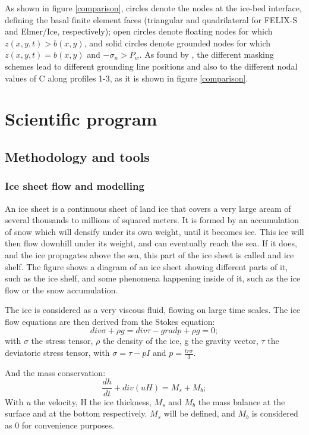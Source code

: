 \documentclass[a4paper,12pt]{article}
\begin{document}
As shown in figure \ref{comparison}, circles denote the nodes at the ice-bed interface, defining the basal finite element faces (triangular and quadrilateral for FELIX-S and Elmer/Ice, respectively); open circles denote floating nodes for which $z(x,y,t)>b(x,y)$, and solid circles denote grounded nodes for which $z(x,y,t)=b(x,y)$ and $-\sigma_n>P_w$. As found by \cite{zhang2017comparison}, the different masking schemes lead to different grounding line positions and also to the different nodal values of C along profiles 1-3, as it is shown in figure \ref{comparison}.


\section{Scientific program}
\subsection{Methodology and tools}
\subsubsection{Ice sheet flow and modelling}
An ice sheet is a continuous sheet of land ice that covers a very large aream of several thousands to millions of squared meters. It is formed by an accumulation of snow which will densify under its own weight, until it becomes ice. This ice will then flow downhill under its weight, and can eventually reach the sea. If it does, and the ice propagates above the sea, this part of the ice sheet is called and ice shelf. The figure shows a diagram of an ice sheet showing different parts of it, such as the ice shelf, and some phenomena happening inside of it, such as the ice flow or the snow accumulation.

The ice is considered as a very viscous fluid, flowing on large time scales. The ice flow equations are then derived from the Stokes equation:
\begin{equation}
	div\sigma + \rho g = div\tau - gradp + \rho g = 0;
\end{equation}
with $\sigma$ the stress tensor, $\rho$ the density of the ice, g the gravity vector, $\tau$ the deviatoric stress tensor, with $\sigma = \tau - pI$ and $p=\frac{tr\sigma}{3}$. 

And the mass conservation:
\begin{equation}
	\frac{dh}{dt}+ div(uH)=M_s + M_b;
\end{equation}
With $u$ the velocity, H the ice thickness, $M_s$ and $M_b$ the mass balance at the surface and at the bottom respectively. $M_s$ will be defined, and $M_b$ is considered as 0 for convenience purposes. 
\end{document}
